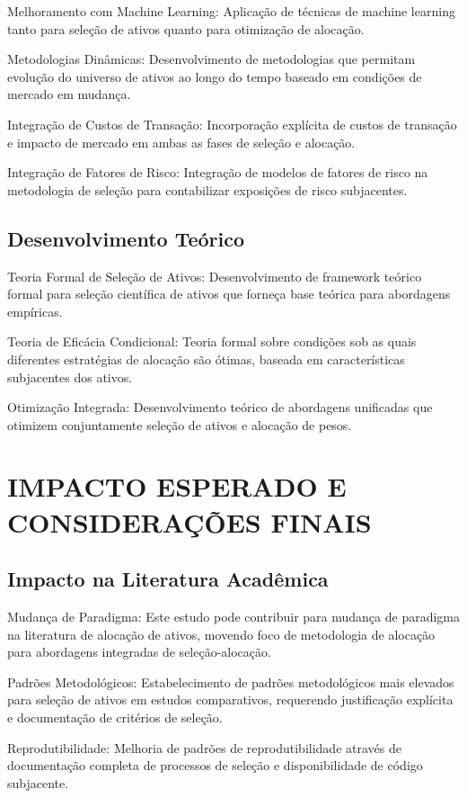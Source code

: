 Melhoramento com Machine Learning: Aplicação de técnicas de machine learning tanto para seleção de ativos quanto para otimização de alocação.

Metodologias Dinâmicas: Desenvolvimento de metodologias que permitam evolução do universo de ativos ao longo do tempo baseado em condições de mercado em mudança.

Integração de Custos de Transação: Incorporação explícita de custos de transação e impacto de mercado em ambas as fases de seleção e alocação.

Integração de Fatores de Risco: Integração de modelos de fatores de risco na metodologia de seleção para contabilizar exposições de risco subjacentes.

\subsection{Desenvolvimento Teórico}

Teoria Formal de Seleção de Ativos: Desenvolvimento de framework teórico formal para seleção científica de ativos que forneça base teórica para abordagens empíricas.

Teoria de Eficácia Condicional: Teoria formal sobre condições sob as quais diferentes estratégias de alocação são ótimas, baseada em características subjacentes dos ativos.

Otimização Integrada: Desenvolvimento teórico de abordagens unificadas que otimizem conjuntamente seleção de ativos e alocação de pesos.

\section{IMPACTO ESPERADO E CONSIDERAÇÕES FINAIS}

\subsection{Impacto na Literatura Acadêmica}

Mudança de Paradigma: Este estudo pode contribuir para mudança de paradigma na literatura de alocação de ativos, movendo foco de metodologia de alocação para abordagens integradas de seleção-alocação.

Padrões Metodológicos: Estabelecimento de padrões metodológicos mais elevados para seleção de ativos em estudos comparativos, requerendo justificação explícita e documentação de critérios de seleção.

Reprodutibilidade: Melhoria de padrões de reprodutibilidade através de documentação completa de processos de seleção e disponibilidade de código subjacente.


